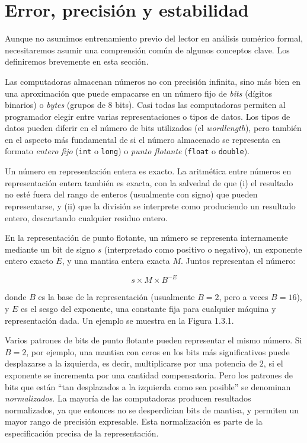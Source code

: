 \documentclass[10pt,a4paper]{book}
\begin{document}
\section{Error, precisión y estabilidad}

Aunque no asumimos entrenamiento previo del lector en análisis numérico formal, necesitaremos asumir una comprensión común de algunos conceptos clave. Los definiremos brevemente en esta sección.

\medskip

Las computadoras almacenan números no con precisión infinita, sino más bien en una aproximación que puede empacarse en un número fijo de \textit{bits} (dígitos binarios) o \textit{bytes} (grupos de 8 bits). Casi todas las computadoras permiten al programador elegir entre varias representaciones o tipos de datos. Los tipos de datos pueden diferir en el número de bits utilizados (el \textit{wordlength}), pero también en el aspecto más fundamental de si el número almacenado se representa en formato \textit{entero fijo} (\texttt{int} o \texttt{long}) o \textit{punto flotante} (\texttt{float} o \texttt{double}).

\medskip

Un número en representación entera es exacto. La aritmética entre números en representación entera también es exacta, con la salvedad de que (i) el resultado no esté fuera del rango de enteros (usualmente con signo) que pueden representarse, y (ii) que la división se interprete como produciendo un resultado entero, descartando cualquier residuo entero.

\medskip

En la representación de punto flotante, un número se representa internamente mediante un bit de signo \( s \) (interpretado como positivo o negativo), un exponente entero exacto \( E \), y una mantisa entera exacta \( M \). Juntos representan el número:

\[
s \times M \times B^{-E} \tag{1.3.1}
\]

donde \( B \) es la base de la representación (usualmente \( B = 2 \), pero a veces \( B = 16 \)), y \( E \) es el sesgo del exponente, una constante fija para cualquier máquina y representación dada. Un ejemplo se muestra en la Figura 1.3.1.

\medskip

Varios patrones de bits de punto flotante pueden representar el mismo número. Si \( B = 2 \), por ejemplo, una mantisa con ceros en los bits más significativos puede desplazarse a la izquierda, es decir, multiplicarse por una potencia de \( 2 \), si el exponente se incrementa por una cantidad compensatoria. Pero los patrones de bits que están “tan desplazados a la izquierda como sea posible” se denominan \textit{normalizados}. La mayoría de las computadoras producen resultados normalizados, ya que entonces no se desperdician bits de mantisa, y permiten un mayor rango de precisión expresable. Esta normalización es parte de la especificación precisa de la representación.
\end{document}
